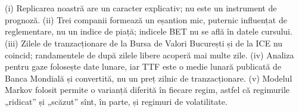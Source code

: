 \section{}
%
{(i) Replicarea noastră are un caracter explicativ; nu este un instrument de prognoză.
(ii) Trei companii formează un eșantion mic, puternic influențat de reglementare, nu un indice de piață; indicele BET nu se află în datele cursului.
(iii) Zilele de tranzacționare de la Bursa de Valori București și de la ICE nu coincid; randamentele de după zilele libere acoperă mai multe zile.
(iv) Analiza pentru gaze folosește date lunare, iar TTF este o medie lunară publicată de Banca Mondială și convertită, nu un preț zilnic de tranzacționare.
(v) Modelul Markov folosit permite o varianță diferită în fiecare regim, astfel că regimurile „ridicat” și „scăzut” sînt, în parte, și regimuri de volatilitate.}

\newpage
